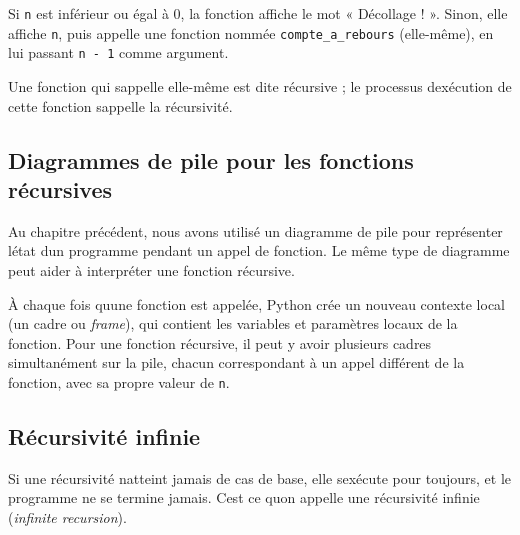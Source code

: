\begin{Shaded}
\begin{Highlighting}[]
    \OperatorTok{\textless{}=} \NormalTok{:}
        \NormalTok{(}\NormalTok{)}
    \NormalTok{:}
\OperatorTok{{-}} \NormalTok{)}
\end{Highlighting}
\end{Shaded}

Si \texttt{n} est inférieur ou égal à 0, la fonction affiche le mot «
Décollage ! ». Sinon, elle affiche \texttt{n}, puis appelle une fonction
nommée \texttt{compte\_a\_rebours} (elle-même), en lui passant
\texttt{n\ -\ 1} comme argument.

Une fonction qui s\textquotesingle appelle elle-même est dite récursive
; le processus d\textquotesingle exécution de cette fonction
s\textquotesingle appelle la récursivité.

\hypertarget{diagrammes-de-pile-pour-les-fonctions-ruxe9cursives}{%
\subsection{Diagrammes de pile pour les fonctions
récursives}\label{diagrammes-de-pile-pour-les-fonctions-ruxe9cursives}}

Au chapitre précédent, nous avons utilisé un diagramme de pile pour
représenter l\textquotesingle état d\textquotesingle un programme
pendant un appel de fonction. Le même type de diagramme peut aider à
interpréter une fonction récursive.

À chaque fois qu\textquotesingle une fonction est appelée, Python crée
un nouveau contexte local (un cadre ou \emph{frame}), qui contient les
variables et paramètres locaux de la fonction. Pour une fonction
récursive, il peut y avoir plusieurs cadres simultanément sur la pile,
chacun correspondant à un appel différent de la fonction, avec sa propre
valeur de \texttt{n}.

\hypertarget{ruxe9cursivituxe9-infinie}{%
\subsection{Récursivité infinie}\label{ruxe9cursivituxe9-infinie}}

Si une récursivité n\textquotesingle atteint jamais de cas de base, elle
s\textquotesingle exécute pour toujours, et le programme ne se termine
jamais. C\textquotesingle est ce qu\textquotesingle on appelle une
récursivité infinie (\emph{infinite recursion}).


